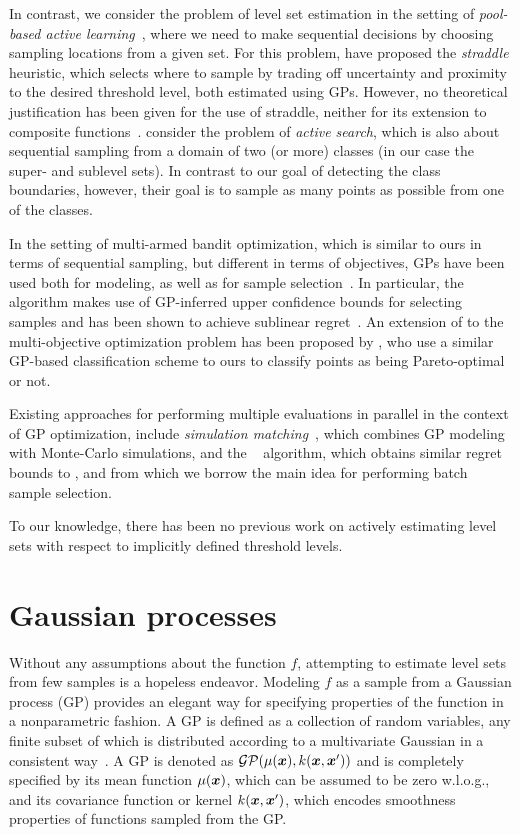 In contrast, we consider the problem of level set estimation in the setting of
\emph{pool-based active learning}~\cite{settles09}, where we need to make
sequential decisions by choosing sampling locations from a given set.
For this problem, \citet{bryan05} have proposed the
\emph{straddle} heuristic, which selects where to sample by trading off
uncertainty and proximity to the desired threshold level, both estimated
using GPs.
However, no theoretical justification has been given for the use of straddle,
neither for its extension to composite functions~\cite{bryan08}.
\citet{garnett12} consider the problem of
\emph{active search}, which is also about sequential sampling from a domain of
two (or more) classes (in our case the super- and sublevel sets).
In contrast to our goal of detecting the class boundaries, however,
their goal is to sample as many points as possible from one of the classes.

In the setting of multi-armed bandit optimization, which is similar to ours
in terms of sequential sampling, but different in terms of objectives,
GPs have been used both for modeling, as well as for sample
selection~\mbox{\cite{brochu10}}. In particular, the \gpucb algorithm
makes use of GP-inferred upper confidence bounds for selecting samples and
has been shown to achieve sublinear regret~\cite{srinivas10}.
An extension of \gpucb to the multi-objective
optimization problem has been proposed by
\citet{zuluaga13}, who use a similar GP-based
classification scheme to ours to classify points as being Pareto-optimal
or not.

Existing approaches for performing multiple evaluations in
parallel in the context of GP optimization, include
\emph{simulation matching}~\cite{azimi10}, which combines GP modeling with
Monte-Carlo simulations, and the \gpbucb~\cite{desautels12} algorithm,
which obtains similar regret bounds to \gpucb, and from which we borrow
the main idea for performing batch sample selection.

To our knowledge, there has been no previous work on actively estimating
level sets with respect to implicitly defined threshold levels.

\section{Gaussian processes}
 Without any assumptions about the function $f$, attempting to estimate level sets from few samples is a hopeless endeavor.
Modeling $f$ as a sample from a Gaussian process
(GP) provides an elegant way for specifying properties of the function in a
nonparametric fashion. A GP is defined as a collection of random variables,
any finite subset of which is distributed according to a
multivariate Gaussian in a consistent way~\cite{rasmussen06}. A GP is
denoted as $\mathcal{GP}(\mu(\bm{x}), k(\bm{x}, \bm{x}'))$ and is
completely specified by its mean function $\mu(\bm{x})$, which can be
assumed to be zero w.l.o.g., and its covariance function or kernel
$k(\bm{x}, \bm{x}')$, which encodes smoothness properties of functions sampled
from the GP.

